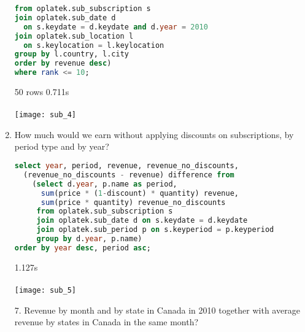 \begin{enumerate}
\begin{lstlisting}[language=sql]
from oplatek.sub_subscription s 
join oplatek.sub_date d 
  on s.keydate = d.keydate and d.year = 2010
join oplatek.sub_location l 
  on s.keylocation = l.keylocation
group by l.country, l.city
order by revenue desc)
where rank <= 10;
\end{lstlisting}
     50 rows 0.711s\\ \\
      \texttt{[image: sub\_4]}
  \item How much would we earn without applying discounts on subscriptions, by period type and by year?
\begin{lstlisting}[language=sql] 
select year, period, revenue, revenue_no_discounts, 
  (revenue_no_discounts - revenue) difference from 
    (select d.year, p.name as period, 
      sum(price * (1-discount) * quantity) revenue, 
      sum(price * quantity) revenue_no_discounts
     from oplatek.sub_subscription s 
     join oplatek.sub_date d on s.keydate = d.keydate
     join oplatek.sub_period p on s.keyperiod = p.keyperiod
     group by d.year, p.name)
order by year desc, period asc;
\end{lstlisting}
     1.127s \\ \\
      \texttt{[image: sub\_5]}
  \item[7.] Revenue by month and by state in Canada in 2010 together with average revenue by states in Canada in the same month?

\end{enumerate}
